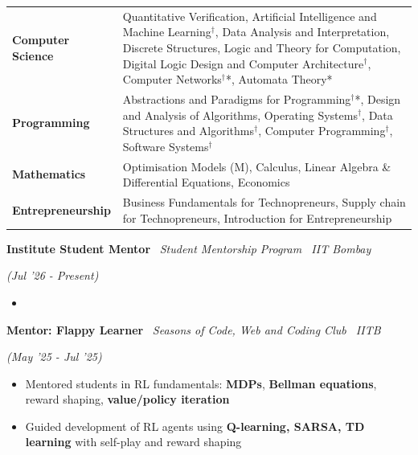 \documentclass[10pt]{article}
\newcommand{\xfill}[2][1ex]{
	\dimen0=#2\advance\dimen0 by #1
	\leaders\hrule height \dimen0 depth -#1\hfill
}
\renewcommand{\section}[1]{
	\vspace{5pt}
	{\color{Blue}{\Large\scshape\raggedright #1\xfill[0pt]{0.5pt}}}
}
\newcommand{\subsectionthree}[3]{
    \vspace{2pt}
    {
        \large
        {\color{Green} \textbf{#1}} \textbar\ {\sl #2} \filldate{#3}
    }
}
\newcommand{\filldate}[1]{\strut\hfill {\small \textit{(#1)}}}
\begin{document}
\begin{tabular}{p{2.7cm} p{14.5cm}}
    \textbf{Computer Science} & Quantitative Verification, Artificial Intelligence and Machine Learning$^\dagger$, Data Analysis and Interpretation, Discrete Structures, Logic and Theory for Computation, Digital Logic Design and Computer Architecture$^\dagger$, Computer Networks$^\dagger$*, Automata Theory* \\
    \textbf{Programming} & Abstractions and Paradigms for Programming$^\dagger$*, Design and Analysis of Algorithms, Operating Systems$^\dagger$, Data Structures and Algorithms$^\dagger$, Computer Programming$^\dagger$, Software Systems$^\dagger$ \\
    \textbf{Mathematics} & Optimisation Models (M), Calculus, Linear Algebra \& Differential Equations, Economics \\
    \textbf{Entrepreneurship} & Business Fundamentals for Technopreneurs, Supply chain for Technopreneurs, Introduction for Entrepreneurship
\end{tabular}

\vspace{2pt}


\vspace{-2pt}


\section{Positions of Responsibility}
\vspace{0.1em}

\vspace{0pt}


\subsectionthree{Institute Student Mentor}{Student Mentorship Program \textbar\ \textit{IIT Bombay}}{Jul '26 - Present}
\begin{itemize}
    \item 
\end{itemize}

\vspace{-3pt}

\subsectionthree{Mentor: Flappy Learner}{Seasons of Code, Web and Coding Club \textbar\ \textit{IITB}}{May '25 - Jul '25}
\begin{itemize}
    \item Mentored students in RL fundamentals: \textbf{MDPs}, \textbf{Bellman equations}, reward shaping, \textbf{value/policy iteration}
    \item Guided development of RL agents using \textbf{Q-learning, SARSA, TD learning} with self-play and reward shaping
\end{itemize}
\end{document}

